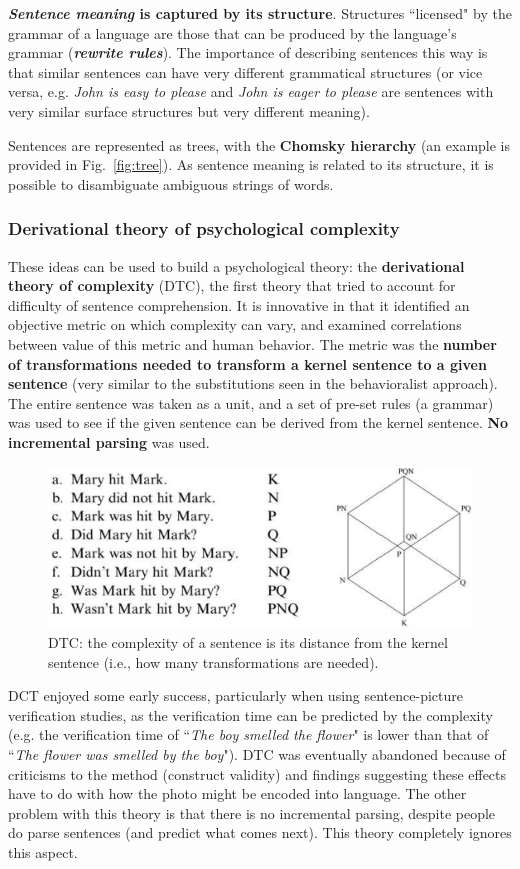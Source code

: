 \textbf{\textit{Sentence meaning} is captured by its structure}. Structures ``licensed" by the grammar of a language are those that can be produced by the language's grammar (\textbf{\textit{rewrite rules}}). The importance of describing sentences this way is that similar sentences can have very different grammatical structures (or vice versa, e.g. \textit{John is easy to please} and \textit{John is eager to please} are sentences with very similar surface structures but very different meaning).

Sentences are represented as trees, with the \textbf{Chomsky hierarchy} (an example is provided in Fig.~\ref{fig:tree}). As sentence meaning is related to its structure, it is possible to disambiguate ambiguous strings of words.

\subsubsection{Derivational theory of psychological complexity}
These ideas can be used to build a psychological theory: the \textbf{derivational theory of complexity} (DTC), the first theory that tried to account for difficulty of sentence comprehension. It is innovative in that it identified an objective metric on which complexity can vary, and examined correlations between value of this metric and human behavior. The metric was the \textbf{number of transformations needed to transform a kernel sentence to a given sentence} (very similar to the substitutions seen in the behavioralist approach). The entire sentence was taken as a unit, and a set of pre-set rules (a grammar) was used to see if the given sentence can be derived from the kernel sentence. \textbf{No incremental parsing} was used.

\begin{figure}[!ht]
    \centering
    \captionsetup{width=.8\linewidth}
    \includegraphics[width=0.5\linewidth]{images/dtc.png}
    \caption*{DTC: the complexity of a sentence is its distance from the kernel sentence (i.e., how many transformations are needed).}
    \label{fig:dtc}
\end{figure}

DCT enjoyed some early success, particularly when using sentence-picture verification studies, as the verification time can be predicted by the complexity (e.g. the verification time of ``\textit{The boy smelled the flower}" is lower than that of ``\textit{The flower was smelled by the boy}").
DTC was eventually abandoned because of criticisms to the method (construct validity) and findings suggesting these effects have to do with how the photo might be encoded into language. The other problem with this theory is that there is no incremental parsing, despite people do parse sentences (and predict what comes next). This theory completely ignores this aspect.

